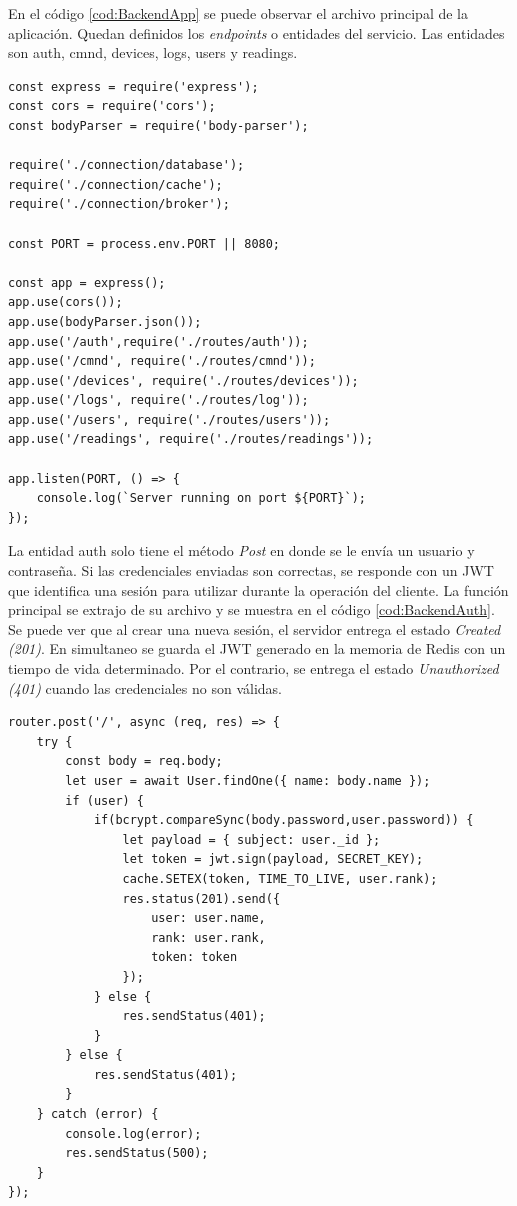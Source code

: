 En el código \ref{cod:BackendApp} se puede observar el archivo principal de la aplicación.
Quedan definidos los \emph{endpoints} o entidades del servicio.
Las entidades son auth, cmnd, devices, logs, users y readings.

\begin{lstlisting}[label=cod:BackendApp,caption=Archivo principal del servicio Backend]
const express = require('express');
const cors = require('cors');
const bodyParser = require('body-parser');

require('./connection/database');
require('./connection/cache');
require('./connection/broker');

const PORT = process.env.PORT || 8080;

const app = express();
app.use(cors());
app.use(bodyParser.json());
app.use('/auth',require('./routes/auth'));
app.use('/cmnd', require('./routes/cmnd'));
app.use('/devices', require('./routes/devices'));
app.use('/logs', require('./routes/log'));
app.use('/users', require('./routes/users'));
app.use('/readings', require('./routes/readings'));

app.listen(PORT, () => { 
    console.log(`Server running on port ${PORT}`); 
});
\end{lstlisting}

La entidad auth solo tiene el método \emph{Post} en donde se le envía un usuario y contraseña.
Si las credenciales enviadas son correctas, se responde con un JWT que identifica una sesión para utilizar durante la operación del cliente.
La función principal se extrajo de su archivo y se muestra en el código \ref{cod:BackendAuth}.
Se puede ver que al crear una nueva sesión, el servidor entrega el estado \emph{Created (201)}.
En simultaneo se guarda el JWT generado en la memoria de Redis con un tiempo de vida determinado.
Por el contrario, se entrega el estado \emph{Unauthorized (401)} cuando las credenciales no son válidas.

\newpage

\begin{lstlisting}[label=cod:BackendAuth,caption=Función principal de la entidad auth]
router.post('/', async (req, res) => {
    try {
        const body = req.body;
        let user = await User.findOne({ name: body.name });
        if (user) {
            if(bcrypt.compareSync(body.password,user.password)) {
                let payload = { subject: user._id };
                let token = jwt.sign(payload, SECRET_KEY);
                cache.SETEX(token, TIME_TO_LIVE, user.rank);
                res.status(201).send({
                    user: user.name,
                    rank: user.rank,
                    token: token
                });
            } else {
                res.sendStatus(401);
            }
        } else {
            res.sendStatus(401);
        }
    } catch (error) {
        console.log(error);
        res.sendStatus(500);
    }
});
\end{lstlisting}

